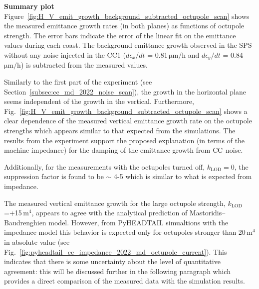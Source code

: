 \textbf{Summary plot}\\
Figure~\ref{fig:H_V_emit_growth_background_subtracted_octupole_scan} shows the measured emittance growth rates (in both planes) as functions of octupole strength. The error bars indicate the error of the linear fit on the emittance values during each coast. The background emittance growth observed in the SPS without any noise injected in the CC1 ($d\epsilon_x/dt$ = 0.81\,$\mathrm{\mu m/h}$ and $d\epsilon_y/dt$ = 0.84\,$\mathrm{\mu m/h}$) is subtracted from the measured values. 

Similarly to the first part of the experiment (see Section~\ref{subsec:cc_md_2022_noise_scan}), the growth in the horizontal plane seems independent of the growth in the vertical. Furthermore, Fig.~\ref{fig:H_V_emit_growth_background_subtracted_octupole_scan} shows a clear dependence of the measured vertical emittance growth rate on the octupole strengths which appears similar to that expected from the simulations. The results from the experiment support the proposed explanation (in terms of the machine impedance) for the damping of the emittance growth from ${\mathrm{CC}}$ noise.

Additionally, for the measurements with the octupoles turned off, $k_\mathrm{LOD}=0$, the suppression factor is found to be $\sim$ 4-5 which is similar to what is expected from impedance.

The measured vertical emittance growth for the large octupole strength, $k_\mathrm{LOD}$=+15\,$\mathrm{m^4}$, appears to agree with the analytical prediction of Mastoridis--Baudrenghien model. However, from PyHEADTAIL simualtions with the impedance model this behavior is expected only for octupoles stronger than 20\,$\mathrm{m^4}$ in absolute value (see Fig.~\ref{fig:pyheadtail_cc_impedance_2022_md_octupole_current}). This indicates that there is some uncertainty about the level of quantitative agreement: this will be discussed further in the following paragraph which provides a direct comparison of the measured data with the simulation results.


